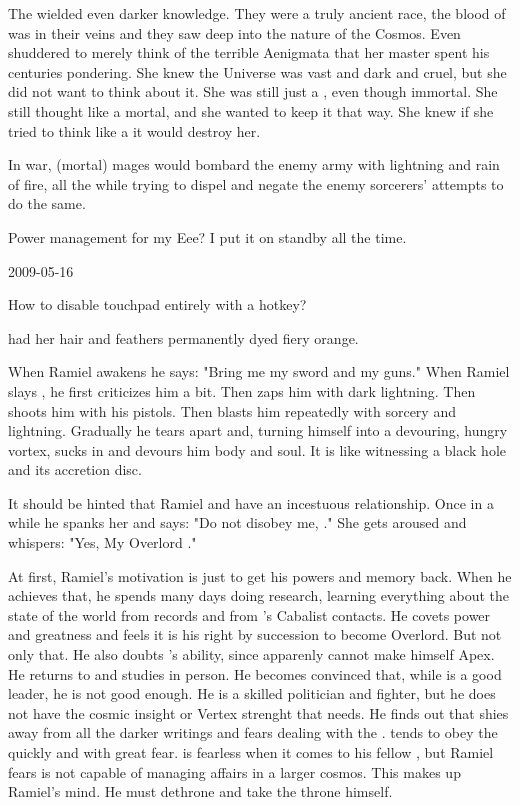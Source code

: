 The \dragons wielded even darker knowledge. 
They were a truly ancient race, the blood of \xs was in their veins and they saw deep into the nature of the Cosmos.
Even \Criseis shuddered to merely think of the terrible Aenigmata that her master spent his centuries pondering.
She knew the Universe was vast and dark and cruel, but she did not want to think about it.
She was still just a \scatha, even though immortal.
She still thought like a mortal, and she wanted to keep it that way.
She knew if she tried to think like a \dragon it would destroy her.

In war, (mortal) mages would bombard the enemy army with lightning and rain of fire, all the while trying to dispel and negate the enemy sorcerers' attempts to do the same. 

Power management for my Eee? I put it on standby all the time. 



2009-05-16

How to disable touchpad entirely with a hotkey?

\Cishiel had her hair and feathers permanently dyed fiery orange.

When Ramiel awakens he says: "Bring me my sword and my guns."
When Ramiel slays \Gilchad, he first criticizes him a bit. 
Then zaps him with dark lightning.
Then shoots him with his pistols.
Then blasts him repeatedly with sorcery and lightning.
Gradually he tears \Gilchad apart and, turning himself into a devouring, hungry vortex, sucks in \Gilchad and devours him body and soul.
It is like witnessing a black hole and its accretion disc.

It should be hinted that Ramiel and \Cishiel have an incestuous relationship. 
Once in a while he spanks her and says: "Do not disobey me, \Cishiel."
She gets aroused and whispers: "Yes, My Overlord \sathariah."

At first, Ramiel's motivation is just to get his powers and memory back. 
When he achieves that, he spends many days doing research, learning everything about the state of the world from records and from \Cishiel's Cabalist contacts.
He covets power and greatness and feels it is his right by succession to become Overlord.
But not only that.
He also doubts \Dasteron's ability, since \Dasteron apparenly cannot make himself Apex. 
He returns to \Mystraacht and studies \Dasteron in person.
He becomes convinced that, while \Dasteron is a good leader, he is not good enough.
He is a skilled politician and fighter, but he does not have the cosmic insight or Vertex strenght that \Mystraacht needs.
He finds out that \Dasteron shies away from all the darker writings and fears dealing with the \banes.
\Dasteron tends to obey the \banes quickly and with great fear.
\Dasteron is fearless when it comes to his fellow \resphain, but Ramiel fears \Dasteron is not capable of managing \resphan affairs in a larger cosmos.
This makes up Ramiel's mind.
He must dethrone \Dasteron and take the throne himself.


